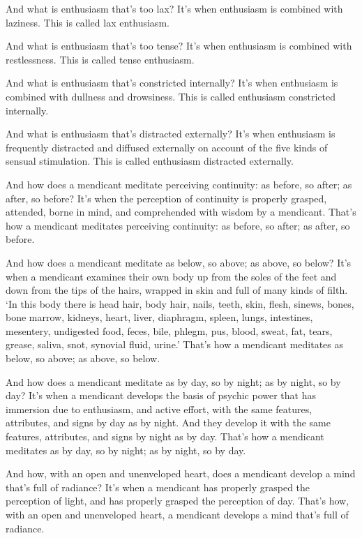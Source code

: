 \documentclass[12pt,openany]{book}%
\begin{document}
And what is enthusiasm that’s too lax? It’s when enthusiasm is combined with laziness. This is called lax enthusiasm. 

And what is enthusiasm that’s too tense? It’s when enthusiasm is combined with restlessness. This is called tense enthusiasm. 

And what is enthusiasm that’s constricted internally? It’s when enthusiasm is combined with dullness and drowsiness. This is called enthusiasm constricted internally. 

And what is enthusiasm that’s distracted externally? It’s when enthusiasm is frequently distracted and diffused externally on account of the five kinds of sensual stimulation. This is called enthusiasm distracted externally. 

And how does a mendicant meditate perceiving continuity: as before, so after; as after, so before? It’s when the perception of continuity is properly grasped, attended, borne in mind, and comprehended with wisdom by a mendicant. That’s how a mendicant meditates perceiving continuity: as before, so after; as after, so before. 

And how does a mendicant meditate as below, so above; as above, so below? It’s when a mendicant examines their own body up from the soles of the feet and down from the tips of the hairs, wrapped in skin and full of many kinds of filth. ‘In this body there is head hair, body hair, nails, teeth, skin, flesh, sinews, bones, bone marrow, kidneys, heart, liver, diaphragm, spleen, lungs, intestines, mesentery, undigested food, feces, bile, phlegm, pus, blood, sweat, fat, tears, grease, saliva, snot, synovial fluid, urine.’ That’s how a mendicant meditates as below, so above; as above, so below. 

And how does a mendicant meditate as by day, so by night; as by night, so by day? It’s when a mendicant develops the basis of psychic power that has immersion due to enthusiasm, and active effort, with the same features, attributes, and signs by day as by night. And they develop it with the same features, attributes, and signs by night as by day. That’s how a mendicant meditates as by day, so by night; as by night, so by day. 

And how, with an open and unenveloped heart, does a mendicant develop a mind that’s full of radiance? It’s when a mendicant has properly grasped the perception of light, and has properly grasped the perception of day. That’s how, with an open and unenveloped heart, a mendicant develops a mind that’s full of radiance. 
\end{document}
